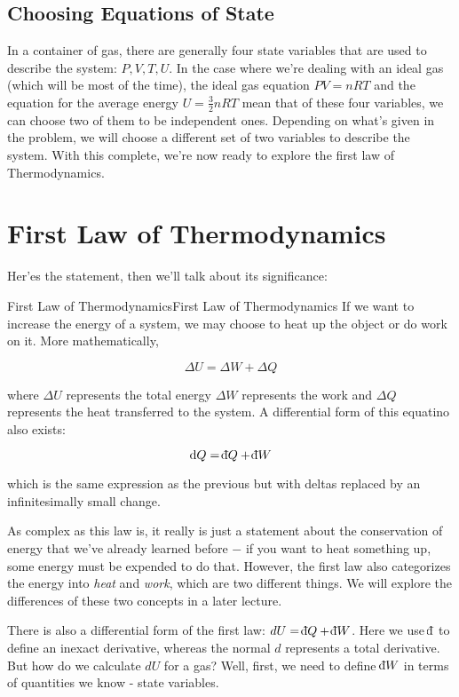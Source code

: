     \subsection{Choosing Equations of State}

    In a container of gas, there are generally four state variables that are used to describe the system: $P, V, T, U$. In the case where we're dealing with an ideal gas (which will be most of the time), the ideal gas equation $PV = nRT$ and the equation for the average energy $U = \frac{3}{2} nRT$ mean that of these four variables, we can choose two of them to be independent ones. Depending on what's given in the problem, we will choose a different set of two variables to describe the system. With this complete, we're now ready to explore the first law of Thermodynamics.

    \section{First Law of Thermodynamics}

    Her'es the statement, then we'll talk about its significance:

    \begin{theorem}{First Law of Thermodynamics}{First Law of Thermodynamics}
      If we want to increase the energy of a system, we may choose to heat up the object or do work on it. More mathematically,

      \[ \Delta U = \Delta W + \Delta Q\] 

      where $\Delta U$ represents the total energy $\Delta W$ represents the work and $\Delta Q$ represents the heat transferred to the system. A differential form of this equatino also exists: 

      \[ \dd Q = \db Q + \db W\]

      which is the same expression as the previous but with deltas replaced by an infinitesimally small change.
    \end{theorem}

    As complex as this law is, it really is just a statement about the conservation of energy that we've already learned before $-$ if you want to heat something up, some energy must be expended to do that. However, the first law also categorizes the energy into \textit{heat} and \textit{work}, which are two different things. We will explore the differences of these two concepts in a later lecture.

    There is also a differential form of the first law: $dU = \db Q + \db W$. Here we use $\db$ to define an inexact derivative, whereas the normal $d$ represents a total derivative. But how do we calculate $dU$ for a gas? Well, first, we need to define $\db W$ in terms of quantities we know - state variables. 

